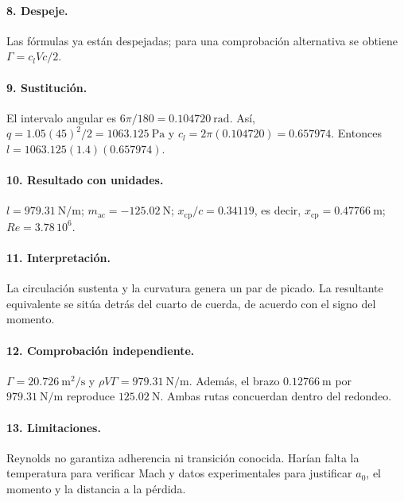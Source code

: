 \paragraph{8. Despeje.} Las fórmulas ya están despejadas; para una comprobación alternativa se obtiene $\Gamma=c_lVc/2$.
\paragraph{9. Sustitución.} El intervalo angular es $6\pi/180=0.104720\ \mathrm{rad}$. Así, $q=1.05(45)^2/2=1063.125\ \mathrm{Pa}$ y $c_l=2\pi(0.104720)=0.657974$. Entonces $l=1063.125(1.4)(0.657974)$.
\paragraph{10. Resultado con unidades.} $l=979.31\ \mathrm{N/m}$; $m_{\mathrm{ac}}=-125.02\ \mathrm{N}$; $x_{\mathrm{cp}}/c=0.34119$, es decir, $x_{\mathrm{cp}}=0.47766\ \mathrm m$; $Re=3.78\,10^6$.
\paragraph{11. Interpretación.} La circulación sustenta y la curvatura genera un par de picado. La resultante equivalente se sitúa detrás del cuarto de cuerda, de acuerdo con el signo del momento.
\paragraph{12. Comprobación independiente.} $\Gamma=20.726\ \mathrm{m^2/s}$ y $\rho V\Gamma=979.31\ \mathrm{N/m}$. Además, el brazo $0.12766\ \mathrm m$ por $979.31\ \mathrm{N/m}$ reproduce $125.02\ \mathrm N$. Ambas rutas concuerdan dentro del redondeo.
\paragraph{13. Limitaciones.} Reynolds no garantiza adherencia ni transición conocida. Harían falta la temperatura para verificar Mach y datos experimentales para justificar $a_0$, el momento y la distancia a la pérdida.



